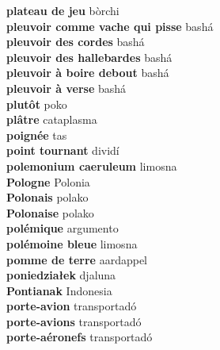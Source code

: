 \textbf{ plateau de jeu  } bòrchi \\
\textbf{ pleuvoir comme vache qui pisse  } bashá \\
\textbf{ pleuvoir des cordes  } bashá \\
\textbf{ pleuvoir des hallebardes  } bashá \\
\textbf{ pleuvoir à boire debout  } bashá \\
\textbf{ pleuvoir à verse  } bashá \\
\textbf{ plutôt  } poko \\
\textbf{ plâtre  } cataplasma \\
\textbf{ poignée  } tas \\
\textbf{ point tournant  } dividí \\
\textbf{ polemonium caeruleum  } limosna \\
\textbf{ Pologne  } Polonia \\
\textbf{ Polonais  } polako \\
\textbf{ Polonaise  } polako \\
\textbf{ polémique  } argumento \\
\textbf{ polémoine bleue  } limosna \\
\textbf{ pomme de terre  } aardappel \\
\textbf{ poniedziałek  } djaluna \\
\textbf{ Pontianak  } Indonesia \\
\textbf{ porte-avion  } transportadó \\
\textbf{ porte-avions  } transportadó \\
\textbf{ porte-aéronefs  } transportadó \\
